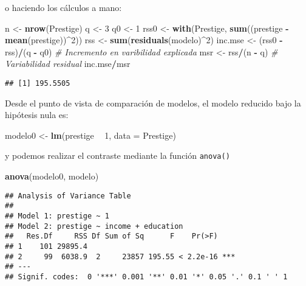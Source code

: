 \documentclass[]{book}
\newenvironment{Shaded}{\begin{snugshade}}{\end{snugshade}}
\newcommand{\KeywordTok}[1]{\textcolor[rgb]{0.13,0.29,0.53}{\textbf{#1}}}
\newcommand{\DataTypeTok}[1]{\textcolor[rgb]{0.13,0.29,0.53}{#1}}
\newcommand{\DecValTok}[1]{\textcolor[rgb]{0.00,0.00,0.81}{#1}}
\newcommand{\StringTok}[1]{\textcolor[rgb]{0.31,0.60,0.02}{#1}}
\newcommand{\CommentTok}[1]{\textcolor[rgb]{0.56,0.35,0.01}{\textit{#1}}}
\newcommand{\OperatorTok}[1]{\textcolor[rgb]{0.81,0.36,0.00}{\textbf{#1}}}
\newcommand{\NormalTok}[1]{#1}
\theoremstyle{break}
\theoremstyle{definition}
\theoremstyle{definition}
\theoremstyle{definition}
\theoremstyle{remark}
\begin{document}
o haciendo los cálculos a mano:

\begin{Shaded}
\begin{Highlighting}[]
\NormalTok{n <-}\StringTok{ }\KeywordTok{nrow}\NormalTok{(Prestige)}
\NormalTok{q <-}\StringTok{ }\DecValTok{3}
\NormalTok{q0 <-}\StringTok{ }\DecValTok{1}
\NormalTok{rss0 <-}\StringTok{ }\KeywordTok{with}\NormalTok{(Prestige, }\KeywordTok{sum}\NormalTok{((prestige }\OperatorTok{-}\StringTok{ }\KeywordTok{mean}\NormalTok{(prestige))}\OperatorTok{^}\DecValTok{2}\NormalTok{))}
\NormalTok{rss <-}\StringTok{ }\KeywordTok{sum}\NormalTok{(}\KeywordTok{residuals}\NormalTok{(modelo)}\OperatorTok{^}\DecValTok{2}\NormalTok{)}
\NormalTok{inc.mse <-}\StringTok{ }\NormalTok{(rss0 }\OperatorTok{-}\StringTok{ }\NormalTok{rss)}\OperatorTok{/}\NormalTok{(q }\OperatorTok{-}\StringTok{ }\NormalTok{q0)  }\CommentTok{# Incremento en varibilidad explicada}
\NormalTok{msr <-}\StringTok{  }\NormalTok{rss}\OperatorTok{/}\NormalTok{(n }\OperatorTok{-}\StringTok{ }\NormalTok{q)               }\CommentTok{# Variabilidad residual}
\NormalTok{inc.mse}\OperatorTok{/}\NormalTok{msr}
\end{Highlighting}
\end{Shaded}

\begin{verbatim}
## [1] 195.5505
\end{verbatim}

Desde el punto de vista de comparación de modelos, el modelo reducido
bajo la hipótesis nula es:

\begin{Shaded}
\begin{Highlighting}[]
\NormalTok{modelo0 <-}\StringTok{ }\KeywordTok{lm}\NormalTok{(prestige }\OperatorTok{~}\StringTok{ }\DecValTok{1}\NormalTok{, }\DataTypeTok{data =}\NormalTok{ Prestige)}
\end{Highlighting}
\end{Shaded}

y podemos realizar el contraste mediante la función \texttt{anova()}

\begin{Shaded}
\begin{Highlighting}[]
\KeywordTok{anova}\NormalTok{(modelo0, modelo)}
\end{Highlighting}
\end{Shaded}

\begin{verbatim}
## Analysis of Variance Table
## 
## Model 1: prestige ~ 1
## Model 2: prestige ~ income + education
##   Res.Df     RSS Df Sum of Sq      F    Pr(>F)    
## 1    101 29895.4                                  
## 2     99  6038.9  2     23857 195.55 < 2.2e-16 ***
## ---
## Signif. codes:  0 '***' 0.001 '**' 0.01 '*' 0.05 '.' 0.1 ' ' 1
\end{verbatim}
\end{document}
